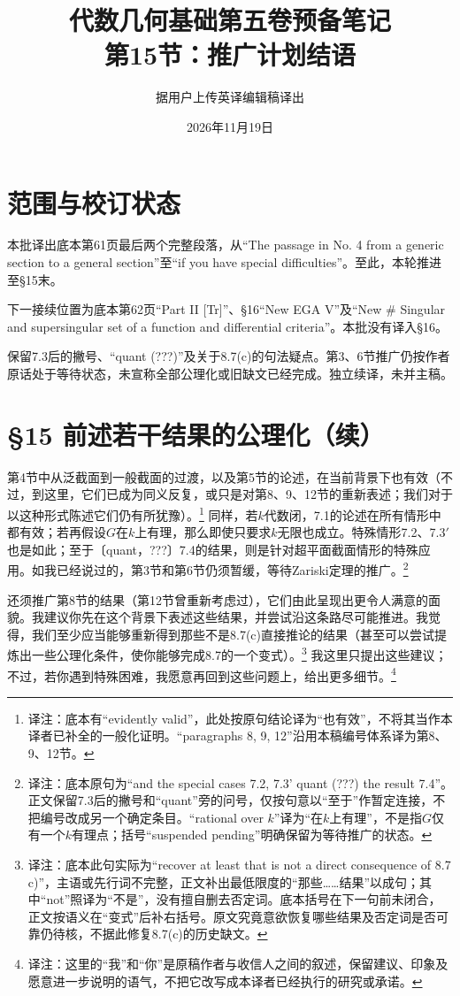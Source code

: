\documentclass[openany,fontset=fandol]{ctexbook}
\newcommand{\note}[1]{\unskip\nobreak\footnote{译注：#1}}
\begin{document}
\title{代数几何基础第五卷预备笔记\\第15节：推广计划结语}
\author{据用户上传英译编辑稿译出}
\date{2026年11月19日}
\maketitle
\chapter*{范围与校订状态}
本批译出底本第61页最后两个完整段落，从“The passage in No. 4 from a generic section to a general section”至“if you have special difficulties”。至此，本轮推进至§15末。

下一接续位置为底本第62页“Part II [Tr]”、§16“New EGA V”及“New \# Singular and supersingular set of a function and differential criteria”。本批没有译入§16。

保留7.3后的撇号、“quant (???)”及关于8.7(c)的句法疑点。第3、6节推广仍按作者原话处于等待状态，未宣称全部公理化或旧缺文已经完成。独立续译，未并主稿。
\chapter*{§15 前述若干结果的公理化（续）}
第4节中从泛截面到一般截面的过渡，以及第5节的论述，在当前背景下也有效（不过，到这里，它们已成为同义反复，或只是对第8、9、12节的重新表述；我们对于以这种形式陈述它们仍有所犹豫）。\note{底本有“evidently valid”，此处按原句结论译为“也有效”，不将其当作本译者已补全的一般化证明。“paragraphs 8, 9, 12”沿用本稿编号体系译为第8、9、12节。}
同样，若$k$代数闭，7.1的论述在所有情形中都有效；若再假设$G$在$k$上有理，那么即使只要求$k$无限也成立。特殊情形7.2、7.3$'$也是如此；至于〔quant，???〕7.4的结果，则是针对超平面截面情形的特殊应用。如我已经说过的，第3节和第6节仍须暂缓，等待Zariski定理的推广。\note{底本原句为“and the special cases 7.2, 7.3' quant (???) the result 7.4”。正文保留7.3后的撇号和“quant”旁的问号，仅按句意以“至于”作暂定连接，不把编号改成另一个确定条目。“rational over $k$”译为“在$k$上有理”，不是指$G$仅有一个$k$有理点；括号“suspended pending”明确保留为等待推广的状态。}

还须推广第8节的结果（第12节曾重新考虑过），它们由此呈现出更令人满意的面貌。我建议你先在这个背景下表述这些结果，并尝试沿这条路尽可能推进。我觉得，我们至少应当能够重新得到那些不是8.7(c)直接推论的结果（甚至可以尝试提炼出一些公理化条件，使你能够完成8.7的一个变式）。\note{底本此句实际为“recover at least that is not a direct consequence of 8.7 c)”，主语或先行词不完整，正文补出最低限度的“那些……结果”以成句；其中“not”照译为“不是”，没有擅自删去否定词。底本括号在下一句前未闭合，正文按语义在“变式”后补右括号。原文究竟意欲恢复哪些结果及否定词是否可靠仍待核，不据此修复8.7(c)的历史缺文。}
我这里只提出这些建议；不过，若你遇到特殊困难，我愿意再回到这些问题上，给出更多细节。\note{这里的“我”和“你”是原稿作者与收信人之间的叙述，保留建议、印象及愿意进一步说明的语气，不把它改写成本译者已经执行的研究或承诺。}
\end{document}
